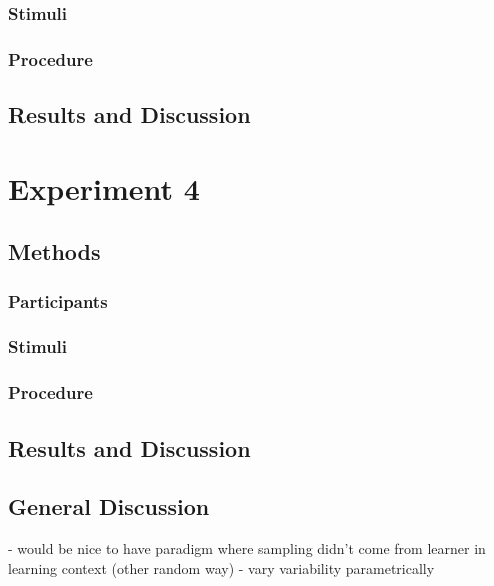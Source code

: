 \documentclass[man]{apa2}
\begin{document}
\subsubsection{Stimuli}


\subsubsection{Procedure}

\subsection{Results and Discussion}

\section{Experiment 4}

\subsection{Methods}

\subsubsection{Participants} 
\subsubsection{Stimuli}


\subsubsection{Procedure}

\subsection{Results and Discussion}

\subsection{General Discussion}

- would be nice to have paradigm where sampling didn't come from learner in learning context (other random way)
- vary variability parametrically






\newpage
\theappendix 
\end{document}
